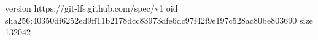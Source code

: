 version https://git-lfs.github.com/spec/v1
oid sha256:40350df6252ed9ff11b2178dcc83973dfe6dc97f42f9e197c528ac80be803690
size 132042
